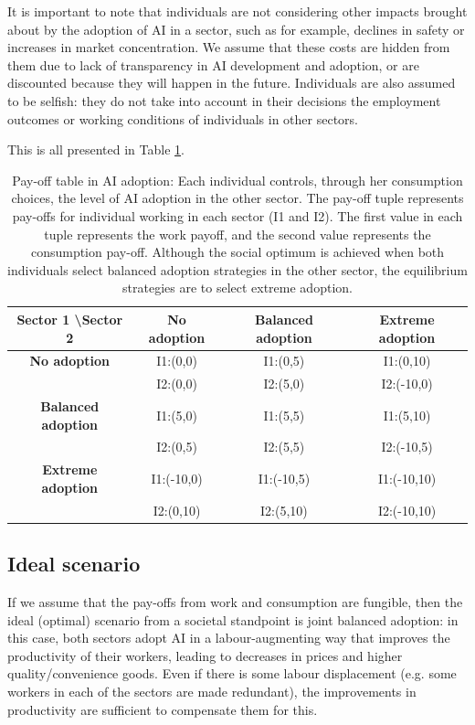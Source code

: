 \documentclass[11pt]{article}
\begin{document}
It is important to note that individuals are not considering other impacts brought about by the adoption of AI in a sector, such as for example, declines in safety or increases in market concentration. We assume that these costs are hidden from them due to lack of transparency in AI development and adoption, or are discounted because they will happen in the future. Individuals are also assumed to be selfish: they do not  take into account in their decisions the employment outcomes or working conditions of individuals in other sectors. 

This is all presented in Table \ref{tab:dilemmas}.

\begin{table}[h!]
    \centering
    \renewcommand{\arraystretch}{1.5} 
    \begin{tabular}[width=\linewidth]{c c c c}
    \textbf{Sector 1} \textbackslash \textbf{Sector 2} &  \textbf{No adoption} & \textbf{Balanced adoption} & \textbf{Extreme adoption} \\
    \hline
    \textbf{No adoption} & I1:(0,0) & I1:(0,5) & I1:(0,10) \\ 
    & I2:(0,0) & I2:(5,0) & I2:(-10,0) \\
    \textbf{Balanced adoption} & I1:(5,0) & I1:(5,5) & I1:(5,10) \\ 
    & I2:(0,5) & I2:(5,5) & I2:(-10,5) \\
    \textbf{Extreme adoption} & I1:(-10,0) & I1:(-10,5) & I1:(-10,10)\\ 
    & I2:(0,10) & I2:(5,10) & I2:(-10,10) \\
    \hline
    \end{tabular}
    \caption{Pay-off table in AI adoption: Each individual controls, through her consumption choices, the level of AI adoption in the other sector. The pay-off tuple represents pay-offs for individual working in each sector (I1 and I2). The first value in each tuple represents the work payoff, and the second value represents the consumption pay-off. Although the social optimum is achieved when both individuals select balanced adoption strategies in the other sector, the equilibrium strategies are to select extreme adoption.}
    \label{tab:dilemmas}
\end{table}

\subsection{Ideal scenario}
\label{subsec:ideal_auto}
If we assume that the pay-offs from work and consumption are fungible, then the ideal (optimal) scenario from a societal standpoint is joint balanced adoption: in this case, both sectors adopt AI in a labour-augmenting way that improves the productivity of their workers, leading to decreases in prices and higher quality/convenience goods. Even if there is some labour displacement (e.g. some workers in each of the sectors are made redundant), the improvements in productivity are sufficient to compensate them for this. 
\end{document}
